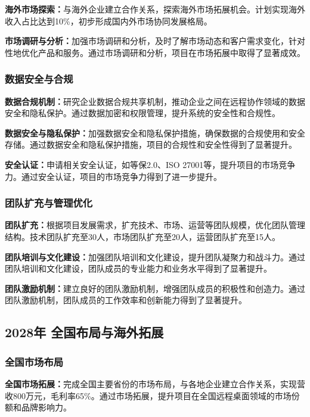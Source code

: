 \documentclass[12pt,a4paper]{article}
\begin{document}
\textbf{海外市场探索：}与海外企业建立合作关系，探索海外市场拓展机会。计划实现海外收入占比达到10\%，初步形成国内外市场协同发展格局。

\textbf{市场调研与分析：}加强市场调研和分析，及时了解市场动态和客户需求变化，针对性地优化产品和服务。通过市场调研和分析，项目在市场拓展中取得了显著成效。

\subsubsection{数据安全与合规}
\textbf{数据合规机制：}研究企业数据合规共享机制，推动企业之间在远程协作领域的数据安全和隐私保护。通过数据加密和权限管理，提升系统的安全性和合规性。

\textbf{数据安全与隐私保护：}加强数据安全和隐私保护措施，确保数据的合规使用和安全存储。通过数据安全和隐私保护措施，项目的合规性和安全性得到了显著提升。

\textbf{安全认证：}申请相关安全认证，如等保2.0、ISO 27001等，提升项目的市场竞争力。通过安全认证，项目的市场竞争力得到了进一步提升。

\subsubsection{团队扩充与管理优化}
\textbf{团队扩充：}根据项目发展需求，扩充技术、市场、运营等团队规模，优化团队管理结构。技术团队扩充至30人，市场团队扩充至20人，运营团队扩充至15人。

\textbf{团队培训与文化建设：}加强团队培训和文化建设，提升团队凝聚力和战斗力。通过团队培训和文化建设，团队成员的专业能力和业务水平得到了显著提升。

\textbf{团队激励机制：}建立良好的团队激励机制，增强团队成员的积极性和创造力。通过团队激励机制，团队成员的工作效率和创新能力得到了显著提升。

\subsection{2028年 全国布局与海外拓展}

\subsubsection{全国市场布局}
\textbf{全国市场拓展：}完成全国主要省份的市场布局，与各地企业建立合作关系，实现营收800万元，毛利率65\%。通过市场拓展，提升项目在全国远程桌面领域的市场份额和品牌影响力。
\end{document}
